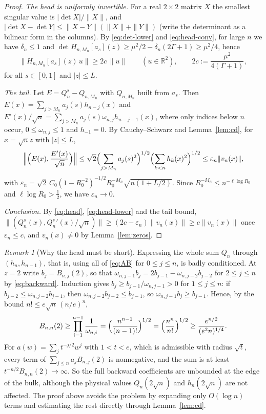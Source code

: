 \documentclass[11pt]{amsart}
\theoremstyle{definition}
\theoremstyle{remark}
\newtheorem{remark}[theorem]{Remark}
\numberwithin{equation}{section}
\newcommand{\R}{\mathbb{R}}
\newcommand{\eps}{\varepsilon}
\begin{document}
\begin{proof}
\emph{The head is uniformly invertible.} For a real $2\times2$ matrix $X$ the smallest singular value is $|\det X|/\|X\|$, and $|\det X-\det Y|\le\|X-Y\|(\|X\|+\|Y\|)$ (write the determinant as a bilinear form in the columns). By \eqref{eq:det-lower} and \eqref{eq:head-conv}, for large $n$ we have $\delta_n\le1$ and $\det H_{n,M_n}[a_s](z)\ge\mu^2/2-\delta_n(2\Gamma+1)\ge\mu^2/4$, hence
\begin{equation}\label{eq:head-lower}
\|H_{n,M_n}[a_s](z)\,u\|\ge2c\,\|u\|\qquad(u\in\R^2),\qquad 2c:=\frac{\mu^2}{4(\Gamma+1)},
\end{equation}
for all $s\in[0,1]$ and $|z|\le L$.

\emph{The tail.} Let $E=Q_n^s-Q_{n,M_n}$ with $Q_{n,M_n}$ built from $a_s$. Then $E(x)=\sum_{j>M_n}a_j(s)h_{n-j}(x)$ and $E'(x)/\sqrt n=\sum_{j>M_n}a_j(s)\omega_{n,j}h_{n-j-1}(x)$, where only indices below $n$ occur, $0\le\omega_{n,j}\le1$ and $h_{-1}=0$. By Cauchy--Schwarz and Lemma~\ref{lem:cd}, for $x=\sqrt nz$ with $|z|\le L$,
\[
\Bigl\|\Bigl(E(x),\frac{E'(x)}{\sqrt n}\Bigr)\Bigr\|\le\sqrt2\Bigl(\sum_{j>M_n}a_j(s)^2\Bigr)^{1/2}\Bigl(\sum_{k<n}h_k(x)^2\Bigr)^{1/2}\le\eps_n\|v_n(x)\|,
\]
with $\eps_n=\sqrt2\,C_0(1-R_0^{-2})^{-1/2}R_0^{-M_n}\sqrt{n(1+L/2)}$. Since $R_0^{-M_n}\le n^{-\ell\log R_0}$ and $\ell\log R_0>\frac12$, we have $\eps_n\to0$.

\emph{Conclusion.} By \eqref{eq:head}, \eqref{eq:head-lower} and the tail bound, $\|(Q_n^s(x),Q_n^s{}'(x)/\sqrt n)\|\ge(2c-\eps_n)\|v_n(x)\|\ge c\|v_n(x)\|$ once $\eps_n\le c$, and $v_n(x)\neq0$ by Lemma~\ref{lem:zeros}.
\end{proof}

\begin{remark}[Why the head must be short]\label{rem:full}
Expressing the whole sum $Q_n$ through $(h_n,h_{n-1})$, that is, using all of \eqref{eq:AB} for $0\le j\le n$, is badly conditioned. At $z=2$ write $b_j=B_{n,j}(2)$, so that $\omega_{n,j-1}b_j=2b_{j-1}-\omega_{n,j-2}b_{j-2}$ for $2\le j\le n$ by \eqref{eq:backward}. Induction gives $b_j\ge b_{j-1}/\omega_{n,j-1}>0$ for $1\le j\le n$: if $b_{j-2}\le\omega_{n,j-2}b_{j-1}$, then $\omega_{n,j-2}b_{j-2}\le b_{j-1}$, so $\omega_{n,j-1}b_j\ge b_{j-1}$. Hence, by the bound $n!\le e\sqrt n\,(n/e)^n$,
\[
B_{n,n}(2)\ge\prod_{i=1}^{n-1}\frac1{\omega_{n,i}}=\Bigl(\frac{n^{n-1}}{(n-1)!}\Bigr)^{1/2}=\Bigl(\frac{n^{n}}{n!}\Bigr)^{1/2}\ge\frac{e^{n/2}}{(e^2n)^{1/4}} .
\]
For $a(w)=\sum_j t^{-j/2}w^j$ with $1<t<e$, which is admissible with radius $\sqrt t$, every term of $\sum_{j\le n}a_jB_{n,j}(2)$ is nonnegative, and the sum is at least $t^{-n/2}B_{n,n}(2)\to\infty$. So the full backward coefficients are unbounded at the edge of the bulk, although the physical values $Q_n(2\sqrt n)$ and $h_n(2\sqrt n)$ are not affected. The proof above avoids the problem by expanding only $O(\log n)$ terms and estimating the rest directly through Lemma~\ref{lem:cd}.
\end{remark}
\end{document}
